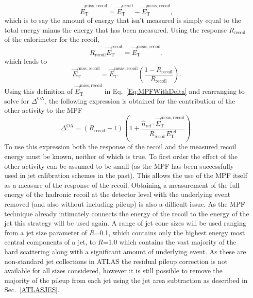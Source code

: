 \begin{equation}
  \vec{E}_{\mathrm T}^{\mathrm{miss, recoil}} = \vec{E}_{\mathrm T}^{\mathrm{recoil}} - \vec{E}_{\mathrm T}^{\mathrm{meas, recoil}}, 
\end{equation}
\noindent 
which is to say the amount of energy that isn't measured is simply equal to the total energy minus the energy that has been measured.  
Using the response $R_{\mathrm{recoil}}$ of the calorimeter for the recoil, 
\begin{equation}
  R_{\mathrm{recoil}}\vec{E}_{\mathrm T}^{\mathrm{recoil}} = \vec{E}_{\mathrm T}^{\mathrm{meas, recoil}}, 
\end{equation}
\noindent
which leads to 
\begin{equation}
  \vec{E}_{\mathrm T}^{\mathrm{miss, recoil}} = \vec{E}_{\mathrm T}^{\mathrm{meas, recoil}}\left(\frac{1-R_{\mathrm{recoil}}}{R_{\mathrm{recoil}}}\right).  
\end{equation}
\noindent
Using this definition of $\vec{E}_{\mathrm T}^{\mathrm{miss, recoil}}$ in Eq.~\ref{Eq:MPFWithDelta} and rearranging to solve for $\Delta^{\mathrm{OA}}$, the following expression is obtained for the contribution of the other activity to the MPF 
\begin{equation}
  \Delta^{\mathrm{OA}}=\left(R_{\mathrm{recoil}}-1\right)\left(1+\frac{\hat n_{\mathrm{ref}}\cdot \vec{E}_{\mathrm T}^{\mathrm{meas, recoil}}}{R_{\mathrm{recoil}}{E}_{\mathrm T}^{\mathrm{ref}}}\right).  
  \label{Eq:OA}
\end{equation} 
To use this expression both the response of the recoil and the measured recoil energy must be known, neither of which is true.  
To first order the effect of the other activity can be assumed to be small (as the MPF has been successfully used in jet calibration schemes in the past).  
This allows the use of the MPF itself as a measure of the response of the recoil.  
Obtaining a measurement of the full energy of the hadronic recoil at the detector level with the underlying event removed (and also without including pileup) is also a difficult issue.  
As the MPF technique already intimately connects the energy of the recoil to the energy of the jet this strategy will be used again.  
A range of jet cone sizes will be used ranging from a jet size parameter of $R$=0.1, which contains only the highest energy most central components of a jet, to $R$=1.0 which contains the vast majority of the hard scattering along with a significant amount of underlying event.   
As these are non-standard jet collections in ATLAS the residual pileup correction is not available for all sizes considered, however it is still possible to remove the majority of the pileup from each jet using the jet area subtraction as described in Sec.~\ref{ATLASJES}.  

